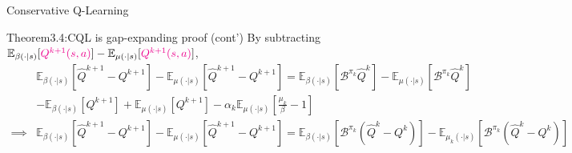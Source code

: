 \documentclass[11pt]{beamer}
\newcommand{\mbb}[1]{\mathbb{#1}}
\newcommand{\mc}[1]{\mathcal{#1}}
\begin{document}
\begin{frame}{Conservative Q-Learning}
  \begin{block}{Theorem3.4:CQL is gap-expanding proof (cont')}
    By subtracting $\mbb{E}_{\beta(\cdot|s)}[\textcolor{magenta}{Q^{k+1}(s,a)}] - \mbb{E}_{\mu(\cdot|s)}[\textcolor{magenta}{Q^{k+1}(s,a)}]$,
    \[
    \begin{aligned}
      &\mbb{E}_{\beta(\cdot|s)}[\hat{Q}^{k+1} - Q^{k+1}] - \mbb{E}_{\mu(\cdot|s)}[\hat{Q}^{k+1} - Q^{k+1}] = \mbb{E}_{\beta(\cdot|s)}\left[\mc{B}^{\pi_k} \hat{Q}^{k}\right] -\mbb{E}_{\mu(\cdot|s)}\left[\mc{B}^{\pi_k} \hat{Q}^{k}\right] \\
      & - \mbb{E}_{\beta(\cdot|s)} [Q^{k+1}] + \mbb{E}_{\mu(\cdot|s)}[Q^{k+1}]  - \alpha_k \mbb{E}_{\mu(\cdot|s)} \left[\frac{\mu_k}{\beta} -1\right]\\
      \implies& \mbb{E}_{\beta(\cdot|s)}[\hat{Q}^{k+1} - Q^{k+1}] - \mbb{E}_{\mu(\cdot|s)}[\hat{Q}^{k+1} - Q^{k+1}] = \mbb{E}_{\beta(\cdot|s)}\left[\mc{B}^{\pi_k} \left(\hat{Q}^{k} - Q^k\right)\right] - \mbb{E}_{\mu_k(\cdot|s)}\left[\mc{B}^{\pi_k}\left(\hat{Q}^k - Q^k\right)\right] \\

\end{aligned}\]
\end{block}
\end{frame}
\end{document}
